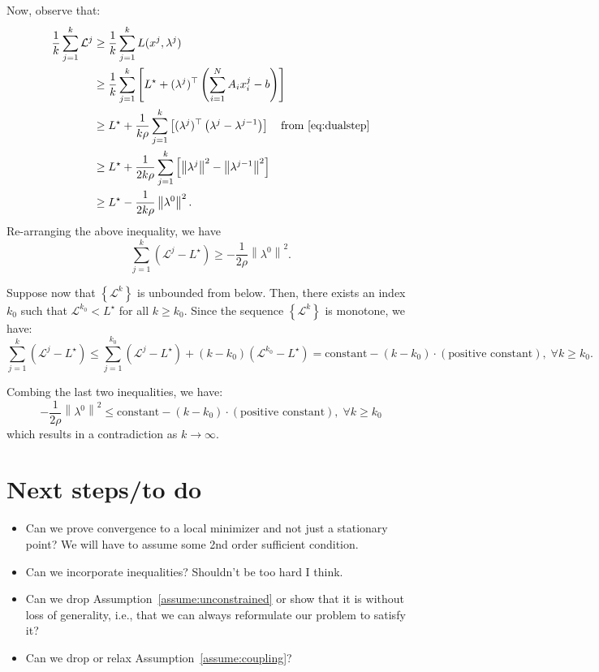 \documentclass[11pt]{article}
\newcommand{\norm}[1]{\left\lVert #1 \right\rVert}
\begin{document}
Now, observe that:
\begin{align*}
\frac{1}{k}\sum_{j=1}^{k} \mathcal{L}^j & \geq \frac{1}{k}\sum_{j=1}^k L(x^j, \lambda^j) \\
&\geq \frac{1}{k}\sum_{j=1}^k \left[L^\star + (\lambda^j)^\top \left(\sum_{i=1}^N A_i x_i^j - b\right) \right] \\
&\geq L^\star + \frac{1}{k\rho}\sum_{j=1}^k \left[(\lambda^j)^\top \left(\lambda^j - \lambda^{j-1}\right)\right] \quad \text{from~\eqref{eq:dualstep}}\\
&\geq L^\star + \frac{1}{2k\rho}\sum_{j=1}^k \left[\norm{\lambda^j}^2  - \norm{\lambda^{j-1}}^2\right] \\
&\geq L^\star - \frac{1}{2k\rho}\norm{\lambda^{0}}^2.
\end{align*}
Re-arranging the above inequality, we have
\begin{equation*}
\sum_{j=1}^k (\mathcal{L}^j - L^\star) \geq -\frac{1}{2\rho}\norm{\lambda^{0}}^2.
\end{equation*}

Suppose now that $\left\{\mathcal{L}^k\right\}$ is unbounded from below. Then, there exists an index $k_0$ such that $\mathcal{L}^{k_0} < L^\star$ for all $k \geq k_0$.
Since the sequence $\left\{\mathcal{L}^k\right\}$ is monotone, we have:
\begin{equation*}
\sum_{j=1}^k (\mathcal{L}^j - L^\star) \leq \sum_{j=1}^{k_0} (\mathcal{L}^j - L^\star) + (k - k_0) (\mathcal{L}^{k_0} - L^\star) = \text{constant} - (k - k_0) \cdot (\text{positive constant}), \; \forall k \geq k_0.
\end{equation*}

Combing the last two inequalities, we have:
\begin{equation*}
-\frac{1}{2\rho}\norm{\lambda^{0}}^2 \leq \text{constant} - (k - k_0) \cdot (\text{positive constant}), \; \forall k \geq k_0
\end{equation*}
which results in a contradiction as $k \to \infty$.

\section{Next steps/to do}
\begin{itemize}
    \item Can we prove convergence to a local minimizer and not just a stationary point? We will have to assume some 2nd order sufficient condition.
    
    \item Can we incorporate inequalities? Shouldn't be too hard I think.
    
    \item Can we drop Assumption~\eqref{assume:unconstrained} or show that it is without loss of generality, i.e., that we can always reformulate our problem to satisfy it?
    
    \item Can we drop or relax Assumption~\eqref{assume:coupling}?
\end{itemize}
\end{document}
